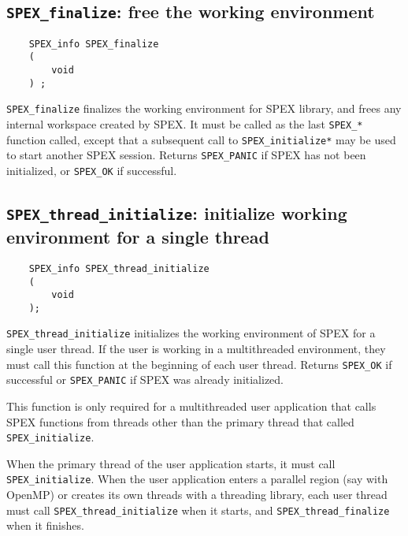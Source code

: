 \documentclass[12pt]{report}
\theoremstyle{definition}
\begin{document}
\subsection{\texttt{SPEX\_finalize}: free the working environment}
\label{ss:SPEX_finalize}

\begin{mdframed}[userdefinedwidth=6in]
{\footnotesize
\begin{verbatim}
    SPEX_info SPEX_finalize
    (
        void
    ) ;
\end{verbatim}
} \end{mdframed}

\verb|SPEX_finalize| finalizes the working environment for SPEX
library, and frees any internal workspace created by SPEX.  It must be
called as the last \verb|SPEX_*| function called, except that a subsequent
call to \verb|SPEX_initialize*| may be used to start another SPEX session.
Returns \verb|SPEX_PANIC| if SPEX has not been initialized,
or \verb|SPEX_OK| if successful.

\subsection{\texttt{SPEX\_thread\_initialize}: initialize working environment for a single thread}

\begin{mdframed}[userdefinedwidth=6in]
{\footnotesize
\begin{verbatim}
    SPEX_info SPEX_thread_initialize 
    ( 
        void 
    );
\end{verbatim}
} \end{mdframed}

\verb|SPEX_thread_initialize| initializes the working environment of SPEX for a single
user thread. If the user is working in a multithreaded environment, they must call 
this function at the beginning of each user thread. Returns \verb|SPEX_OK| if successful 
or \verb|SPEX_PANIC| if SPEX was already initialized.

This function is only required for a multithreaded user application that
calls SPEX functions from threads other than the primary thread that
called \verb'SPEX_initialize'.

When the primary thread of the user application starts, it must call
\verb'SPEX_initialize'.  When the user application enters a parallel
region (say with OpenMP) or creates its own threads with a threading library,
each user thread must call \verb'SPEX_thread_initialize' when it starts,
and \verb'SPEX_thread_finalize' when it finishes.
\end{document}
